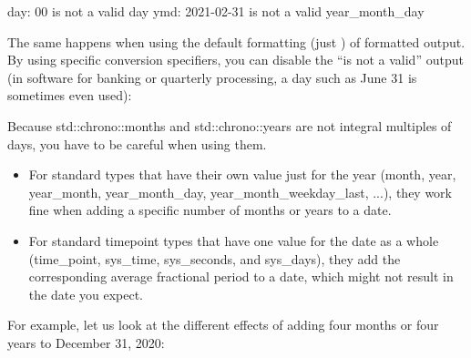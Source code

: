\begin{shell}
day: 00 is not a valid day
ymd: 2021-02-31 is not a valid year_month_day
\end{shell}

The same happens when using the default formatting (just {}) of formatted output. By using specific conversion specifiers, you can disable the “is not a valid” output (in software for banking or quarterly processing, a day such as June 31 is sometimes even used):



Because std::chrono::months and std::chrono::years are not integral multiples of days, you have to be careful when using them.

\begin{itemize}
\item 
For standard types that have their own value just for the year (month, year, year\_month, year\_month\_day, year\_month\_weekday\_last, ...), they work fine when adding a specific number of months or years to a date.

\item
For standard timepoint types that have one value for the date as a whole (time\_point, sys\_time, sys\_seconds, and sys\_days), they add the corresponding average fractional period to a date, which might not result in the date you expect. 
\end{itemize}

For example, let us look at the different effects of adding four months or four years to December 31, 2020:

